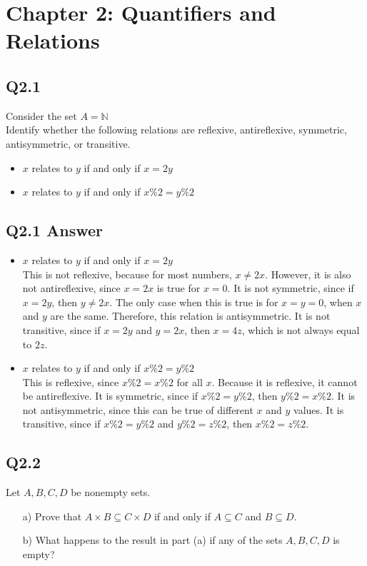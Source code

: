 \documentclass{article}
\begin{document}
\section*{Chapter 2: Quantifiers and Relations}

\subsection*{Q2.1}
Consider the set $A=\mathbb{N}$
\\ Identify whether the following relations are reflexive, antireflexive, symmetric, antisymmetric, or transitive.
\begin{itemize}
    \item $x$ relates to $y$ if and only if $x=2y$ 
    \item $x$ relates to $y$ if and only if $x\%2=y\%2$
\end{itemize}
\newpage
\subsection*{Q2.1 Answer}
\begin{itemize}
    \item $x$ relates to $y$ if and only if $x=2y$
    \\ This is not reflexive, because for most numbers, $x\neq 2x$. However, it is also not antireflexive, since $x=2x$ is true for $x=0$. It is not symmetric, since if $x=2y$, then $y\neq2x$. The only case when this is true is for $x=y=0$, when $x$ and $y$ are the same. Therefore, this relation is antisymmetric. It is not transitive, since if $x=2y$ and $y=2x$, then $x=4z$, which is not always equal to $2z$.
    \item $x$ relates to $y$ if and only if $x\%2=y\%2$
    \\ This is reflexive, since $x\%2=x\%2$ for all $x$. Because it is reflexive, it cannot be antireflexive. It is symmetric, since if $x\%2=y\%2$, then   $y\%2=x\%2$. It is not antisymmetric, since this can be true of different $x$ and $y$ values. It is transitive, since if $x\%2=y\%2$ and $y\%2=z\%2$, then $x\%2=z\%2$.
\end{itemize}
\newpage

\subsection*{Q2.2}
Let \( A, B, C, D \) be nonempty sets.
\begin{enumerate}
    \item[a)] Prove that \( A \times B \subseteq C \times D \) if and only if \( A \subseteq C \) and \( B \subseteq D \).
    \item[b)] What happens to the result in part (a) if any of the sets \( A, B, C, D \) is empty?
\end{enumerate}
\newpage
\end{document}
